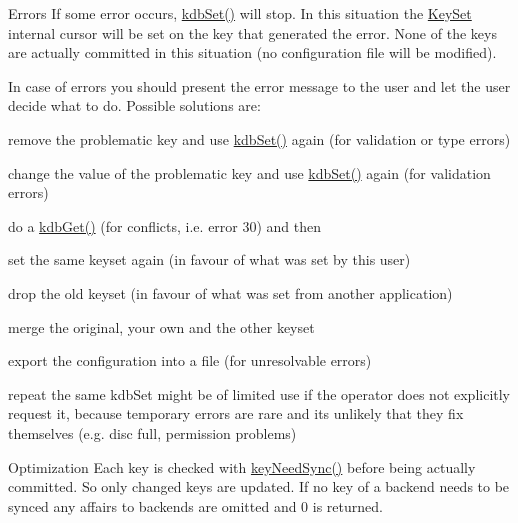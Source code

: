 \begin{DoxyParagraph}{Errors}
If some error occurs, \hyperlink{group__kdb_ga11436b058408f83d303ca5e996832bcf}{kdb\-Set()} will stop. In this situation the \hyperlink{classkdb_1_1KeySet}{Key\-Set} internal cursor will be set on the key that generated the error. None of the keys are actually committed in this situation (no configuration file will be modified).
\end{DoxyParagraph}
In case of errors you should present the error message to the user and let the user decide what to do. Possible solutions are\-:
\begin{DoxyItemize}
\item remove the problematic key and use \hyperlink{group__kdb_ga11436b058408f83d303ca5e996832bcf}{kdb\-Set()} again (for validation or type errors)
\item change the value of the problematic key and use \hyperlink{group__kdb_ga11436b058408f83d303ca5e996832bcf}{kdb\-Set()} again (for validation errors)
\item do a \hyperlink{group__kdb_ga28e385fd9cb7ccfe0b2f1ed2f62453a1}{kdb\-Get()} (for conflicts, i.\-e. error 30) and then
\begin{DoxyItemize}
\item set the same keyset again (in favour of what was set by this user)
\item drop the old keyset (in favour of what was set from another application)
\item merge the original, your own and the other keyset
\end{DoxyItemize}
\item export the configuration into a file (for unresolvable errors)
\item repeat the same kdb\-Set might be of limited use if the operator does not explicitly request it, because temporary errors are rare and its unlikely that they fix themselves (e.\-g. disc full, permission problems)
\end{DoxyItemize}

\begin{DoxyParagraph}{Optimization}
Each key is checked with \hyperlink{group__keytest_gaf247df0de7aca04b32ef80e39ef12950}{key\-Need\-Sync()} before being actually committed. So only changed keys are updated. If no key of a backend needs to be synced any affairs to backends are omitted and 0 is returned.
\end{DoxyParagraph}

